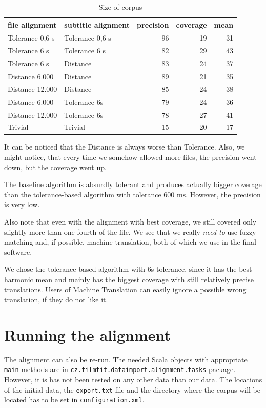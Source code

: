 \begin{table}[h]
\begin{center}
\begin{tabular}{|l|l|r|r|r|}
    \hline
    \textbf{file alignment} & \textbf{subtitle alignment} & \textbf{precision} & \textbf{coverage} & \textbf{mean} \\ \hline
    Tolerance 0,6 s & Tolerance 0,6 s & 96  & 19  & 31 \\ \hline
    Tolerance 6 s & Tolerance 6 s & 82  & 29 & 43 \\ \hline
    Tolerance 6 s & Distance & 83 & 24 & 37 \\ \hline
    Distance 6.000 & Distance &  89 & 21 & 35 \\ \hline
    Distance 12.000 & Distance & 85 & 24 & 38 \\ \hline
    Distance 6.000 & Tolerance 6s & 79 & 24 & 36 \\ \hline
    Distance 12.000 & Tolerance 6s & 78 & 27 & 41 \\ \hline
    Trivial & Trivial & 15 & 20 & 17 \\ \hline
    
\end{tabular}
\end{center}

\caption{Size of corpus}\label{tm_simulation}
\end{table}

It can be noticed that the Distance is always worse than Tolerance. Also, we might notice, that every time we somehow allowed more files, the precision went down, but the coverage went up.

The baseline algorithm is absurdly tolerant and produces actually bigger coverage than the tolerance-based algorithm with tolerance 600 ms. However, the precision is very low.

Also note that even with the alignment with best coverage, we still covered only slightly more than one fourth of the file. We see that we really \emph{need to} use fuzzy matching and, if possible, machine translation, both of which we use in the final software.

We chose the tolerance-based algorithm with 6s tolerance, since it has the best harmonic mean and mainly has the biggest coverage with still relatively precise translations. Users of Machine Translation can easily ignore a possible wrong translation, if they do not like it.

\section{Running the alignment}
The alignment can also be re-run. The needed Scala objects with appropriate \texttt{main} methods are in \texttt{cz.filmtit.dataimport.alignment.tasks} package. However, it is has not been tested on any other data than our data. The locations of the initial data, the \texttt{export.txt} file and the directory where the corpus will be located has to be set in \texttt{configuration.xml}.

